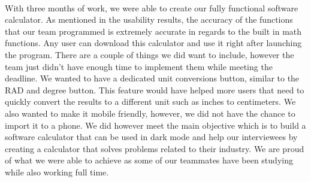        \paragraph{}
        With three months of work, we were able to create our fully functional software calculator. As mentioned in the usability results, the accuracy of the functions that our team programmed is extremely accurate in regards to the built in math functions. Any user can download this calculator and use it right after launching the program. There are a couple of things we did want to include, however the team just didn’t have enough time to implement them while meeting the deadline. We wanted to have a dedicated unit conversions button, similar to the RAD and degree button. This feature would have helped more users that need to quickly convert the results to a different unit such as inches to centimeters. We also wanted to make it mobile friendly, however, we did not have the chance to import it to a phone. We did however meet the main objective which is to build a software calculator that can be used in dark mode and help our interviewees by creating a calculator that solves problems related to their industry. We are proud of what we were able to achieve as some of our teammates have been studying while also working full time.


